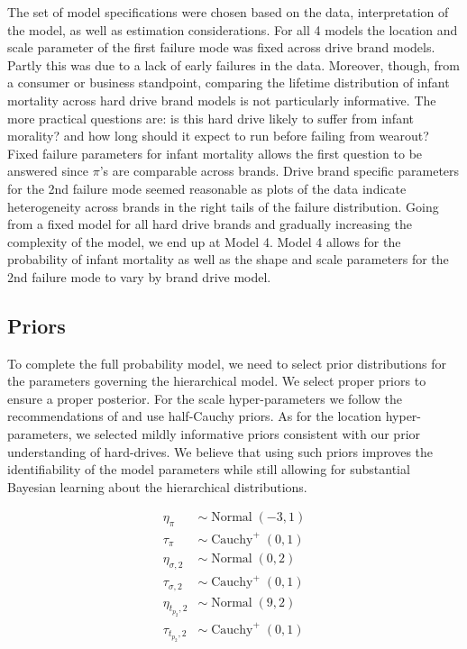 \documentclass[12pt]{article}
\newcommand{\op}{\operatorname}
\begin{document}
The set of model specifications were chosen based on the data, interpretation of the model, as well as estimation considerations.  For all 4 models the location and scale parameter of the first failure mode was fixed across drive brand models.  Partly this was due to a lack of early failures in the data.  Moreover, though, from a consumer or business standpoint, comparing the lifetime distribution of infant mortality across hard drive brand models is not particularly informative.  The more practical questions are: is this hard drive likely to suffer from infant morality? and how long should it expect to run before failing from wearout?  Fixed failure parameters for infant mortality allows the first question to be answered since $\pi$'s are comparable across brands.  Drive brand specific parameters for the 2nd failure mode seemed reasonable as plots of the data indicate heterogeneity across brands in the right tails of the failure distribution.  Going from a fixed model for all hard drive brands and gradually increasing the complexity of the model, we end up at Model 4.  Model 4 allows for the probability of infant mortality as well as the shape and scale parameters for the 2nd failure mode to vary by brand drive model.

\subsection{Priors}
To complete the full probability model, we need to select prior distributions for the parameters governing the hierarchical model. We select proper priors to ensure a proper posterior. For the scale hyper-parameters we follow the recommendations of \citet{gelman2014bayesian} and use half-Cauchy priors. As for the location hyper-parameters, we selected mildly informative priors consistent with our prior understanding of hard-drives. We believe that using such priors improves the identifiability of the model parameters while still allowing for substantial Bayesian learning about the hierarchical distributions.

\begin{align*}
  \eta_{\pi} & \sim \op{Normal}(-3, 1)\\
  \tau_{\pi} & \sim \op{Cauchy}^+(0, 1)\\
  \eta_{\sigma ,2} & \sim \op{Normal}(0, 2)\\
  \tau_{\sigma ,2} & \sim \op{Cauchy}^+(0, 1)\\
  \eta_{t_{p_2},2} & \sim \op{Normal}(9, 2)\\
  \tau_{t_{p_2},2} & \sim \op{Cauchy}^+(0, 1)
 \end{align*} 
\end{document}
